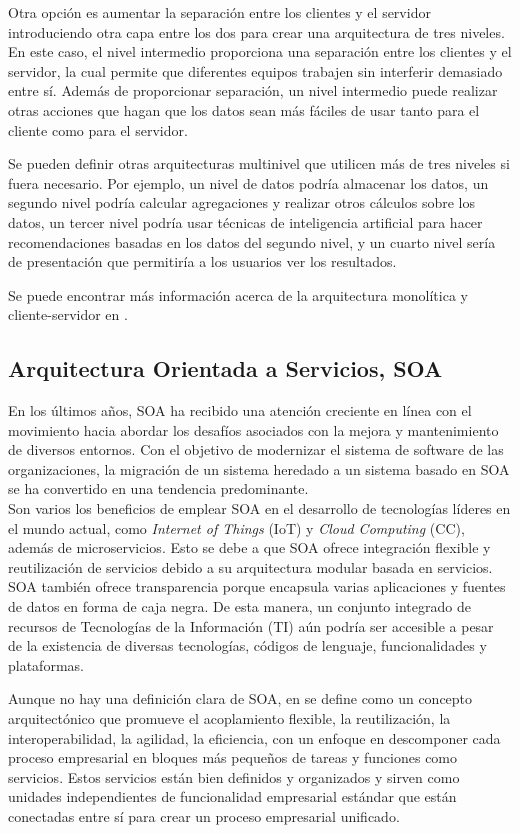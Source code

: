 Otra opción es aumentar la separación entre los clientes y el servidor introduciendo otra capa entre los dos para crear una arquitectura de tres niveles.
En este caso, el nivel intermedio proporciona una separación entre los clientes y el servidor, la cual permite que diferentes equipos trabajen sin interferir demasiado entre sí.
Además de proporcionar separación, un nivel intermedio puede realizar otras acciones que hagan que los datos sean más fáciles de usar tanto para el cliente como para el servidor.

Se pueden definir otras arquitecturas multinivel que utilicen más de tres niveles si fuera necesario. Por ejemplo, un nivel de datos podría almacenar los datos, un segundo nivel podría calcular agregaciones y realizar otros cálculos sobre los datos, un tercer nivel podría usar técnicas de inteligencia artificial para hacer recomendaciones basadas en los datos del segundo nivel, y un cuarto nivel sería de presentación que permitiría a los usuarios ver los resultados.

Se puede encontrar más información acerca de la arquitectura monolítica y cliente-servidor en \cite{stephens2015beginning}.
\subsection{Arquitectura Orientada a Servicios, SOA}
En los últimos años, SOA ha recibido una atención creciente en línea con el movimiento hacia abordar los desafíos asociados con la mejora y mantenimiento de diversos entornos. Con el objetivo de modernizar el sistema de software de las organizaciones, la migración de un sistema heredado a un sistema basado en SOA se ha convertido en una tendencia predominante. \\
Son varios los beneficios de emplear SOA en el desarrollo de tecnologías líderes en el mundo actual, como \textit{Internet of Things} (IoT) y \textit{Cloud Computing} (CC), además de microservicios. Esto se debe a que SOA ofrece integración flexible y reutilización de servicios debido a su arquitectura modular basada en servicios. SOA también ofrece transparencia porque encapsula varias aplicaciones y fuentes de datos en forma de caja negra. De esta manera, un conjunto integrado de recursos de Tecnologías de la Información (TI) aún podría ser accesible a pesar de la existencia de diversas tecnologías, códigos de lenguaje, funcionalidades y plataformas.

Aunque no hay una definición clara de SOA, en \cite{soa} se define como un concepto arquitectónico que promueve el acoplamiento flexible, la reutilización, la interoperabilidad, la agilidad, la eficiencia, con un enfoque en descomponer cada proceso empresarial en bloques más pequeños de tareas y funciones como servicios. Estos servicios están bien definidos y organizados y sirven como unidades independientes de funcionalidad empresarial estándar que están conectadas entre sí para crear un proceso empresarial unificado.

